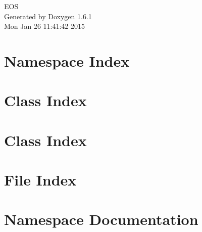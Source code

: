 \documentclass[a4paper]{book}
\begin{document}
\hypersetup{pageanchor=false}
\begin{titlepage}
\vspace*{7cm}
\begin{center}
{\Large EOS }\\
\vspace*{1cm}
{\large Generated by Doxygen 1.6.1}\\
\vspace*{0.5cm}
{\small Mon Jan 26 11:41:42 2015}\\
\end{center}
\end{titlepage}
\clearemptydoublepage
{}
\tableofcontents
\clearemptydoublepage
{}
\hypersetup{pageanchor=true}
\chapter{Namespace Index}

\chapter{Class Index}

\chapter{Class Index}

\chapter{File Index}

\chapter{Namespace Documentation}












\end{document}
